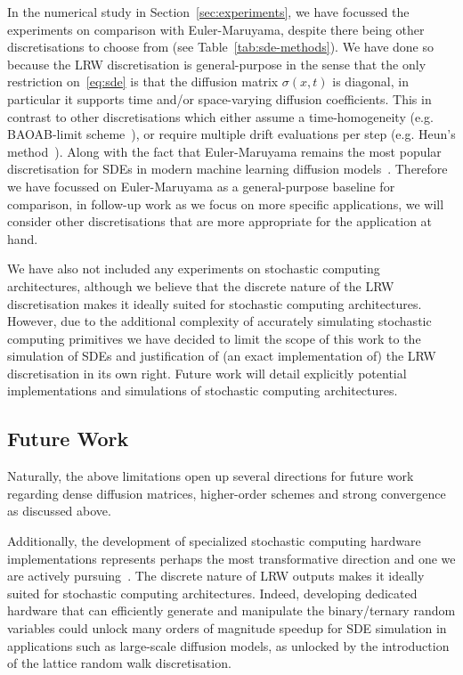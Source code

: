 \documentclass[pra,showpacs,amsmath,amssymb,amsfonts,lengthcheck,longbibliography,onecolumn]{revtex4-2}
\begin{document}
In the numerical study in Section~\ref{sec:experiments}, we have focussed the experiments
on comparison with Euler-Maruyama, despite there being other discretisations to choose from
(see Table~\ref{tab:sde-methods}). We have done so because the LRW discretisation
is general-purpose in the sense that the only restriction on~\eqref{eq:sde} is that the
diffusion matrix $\sigma(x,t)$ is diagonal, in particular it supports time and/or space-varying
diffusion coefficients. This in contrast to other discretisations which either assume
a time-homogeneity (e.g. BAOAB-limit scheme~\cite{leimkuhler2013rational}),
or require multiple drift evaluations per step (e.g. Heun's method~\cite{kidger2020neural}).
Along with the fact that Euler-Maruyama remains the most popular discretisation for SDEs
in modern machine learning diffusion models~\cite{karras2022elucidating, song2020score}.
Therefore we have focussed on Euler-Maruyama as a general-purpose baseline for comparison,
in follow-up work as we focus on more specific applications, we will consider other
discretisations that are more appropriate for the application at hand.

We have also not included any experiments on stochastic computing architectures,
although we believe that the discrete nature of the LRW discretisation makes it
ideally suited for stochastic computing architectures. However, due to the additional
complexity of accurately simulating stochastic computing primitives we have decided to limit
the scope of this work to the simulation of SDEs and justification of (an exact implementation of)
the LRW discretisation in its own right. Future work will detail explicitly potential implementations
and simulations of stochastic computing architectures.

\subsection{Future Work}

Naturally, the above limitations open up several directions for future work
regarding dense diffusion matrices, higher-order schemes and strong convergence as discussed
above.

Additionally, the development of specialized stochastic computing hardware implementations represents 
perhaps the most transformative direction and one we are actively pursuing~\cite{melanson2025thermodynamic,belateche2025scaling,coles2023thermodynamic_published,aifer2025solving,duffield2023thermodynamic,donatella2024thermodynamic}.
The discrete nature of LRW outputs makes it 
ideally suited for stochastic computing architectures. Indeed, developing dedicated hardware 
that can efficiently generate and manipulate the binary/ternary random variables  could 
unlock many orders of magnitude speedup for SDE simulation in applications such as
large-scale diffusion models, as unlocked
by the introduction of the lattice random walk discretisation.
\end{document}

